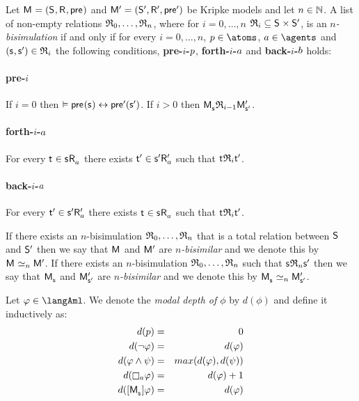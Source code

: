 \begin{definition}[$n$-bisimulation]
Let $\aModelAndTuple$ and $\aModelAndTupleP$ be Kripke models and let $n \in \mathbb{N}$.
A list of non-empty relations $\mathfrak{R}_0, \dots, \mathfrak{R}_n$, where for $i = 0, \dots, n$ $\bisimulation_i \subseteq \aStates \times \aStatesP$, is an {\em $n$-bisimulation} if and only if for every $i = 0, \dots, n$, $\atomP \in \atoms$, $\agentA \in \agents$ and $(\aStateS, \aStateSP) \in \bisimulation_i$ the following conditions, {\bf pre-$i$-$p$}, {\bf forth-$i$-$a$} and {\bf back-$i$-$b$} holds:

\paragraph{pre-$i$}
If $i = 0$ then $\entails \aPrecondition(\aStateS) \iff \aPreconditionP(\aStateSP)$.
If $i > 0$ then $\aPModel{\aStateS} \bisimulation_{i-1} \aPModelP{\aStateSP}$.

\paragraph{forth-$i$-$a$}
For every $\aStateT \in \aSuccessorsA{\aStateS}$ there exists ${\mathsf{{t}}^{\prime}} \in {{\mathsf{{s}}^{\prime}}} {\mathsf{R}^{\prime}_{a}}$ such that $\aStateT \bisimulation_i \aStateTP$.

\paragraph{back-$i$-$a$}
For every ${\mathsf{{t}}^{\prime}} \in {{\mathsf{{s}}^{\prime}}} {\mathsf{R}^{\prime}_{a}}$ there exists $\aStateT \in \aSuccessorsA{\aStateS}$ such that $\aStateT \bisimulation_i \aStateTP$.

If there exists an $n$-bisimulation $\mathfrak{R}_0, \dots, \mathfrak{R}_n$ that is a total relation between $\aStates$ and ${\mathsf{S}^{\prime}}$ then we say that $\aModel$ and ${\mathsf{M}^{\prime}}$ are {\em $n$-bisimilar} and we denote this by $\aModel \bisimilar[n] \aModelP$.
If there exists an $n$-bisimulation $\mathfrak{R}_0, \dots, \mathfrak{R}_n$ such that $\aStateS \bisimulation_n \aStateSP$ then we say that $\aPModel{\aStateS}$ and ${\mathsf{M}^{\prime}_{{\mathsf{{s}}^{\prime}}}}$ are {\em $n$-bisimilar} and we denote this by $\aPModel{\aStateS} \bisimilar[n] \aPModelP{\aStateSP}$.
\end{definition}

\begin{definition}
Let $\phi \in \langAml$.
We denote the {\em modal depth of $\phi$} by $d(\phi)$ and define it inductively as:
\begin{eqnarray*}
    d(\atomP) &=& 0\\
    d(\lnot \phi) &=& d(\phi)\\
    d(\phi \land \psi) &=& max(d(\phi), d(\psi))\\
    d(\necessaryA \phi) &=& d(\phi) + 1\\
    d(\actionA{\aPModel{\aStateS}} \phi) &=& d(\phi)
\end{eqnarray*}
\end{definition}

